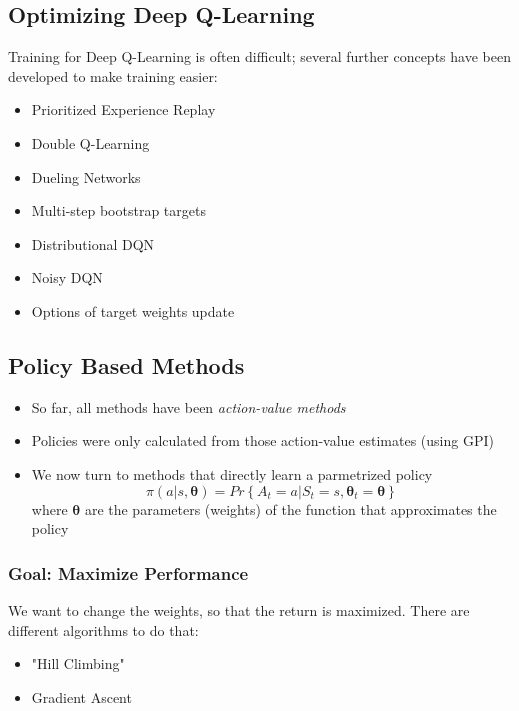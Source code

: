\subsection{Optimizing Deep Q-Learning}
Training for Deep Q-Learning is often difficult; several further concepts have been developed to make training easier:
\begin{itemize}
    \item Prioritized Experience Replay
    \item Double Q-Learning
    \item Dueling Networks
    \item Multi-step bootstrap targets
    \item Distributional DQN
    \item Noisy DQN
    \item Options of target weights update
\end{itemize}

\subsection{Policy Based Methods}
\begin{itemize}
    \item So far, all methods have been \textit{action-value methods}
    \item Policies were only calculated from those action-value estimates (using GPI)
    \item We now turn to methods that directly learn a parmetrized policy
    \[
    \pi(a|s,\boldsymbol{\theta}) = Pr\left\{A_t = a|S_t = s,\boldsymbol{\theta}_t = \boldsymbol{\theta}\right\}
    \]
    where \(\boldsymbol{\theta}\) are the parameters (weights) of the function that approximates the policy
\end{itemize}
\subsubsection*{Goal: Maximize Performance}
We want to change the weights, so that the return is maximized.
There are different algorithms to do that:
\begin{itemize}
    \item "Hill Climbing"
    \item Gradient Ascent
\end{itemize}

